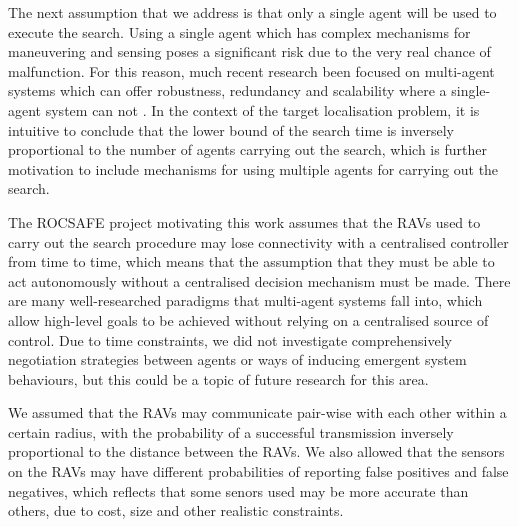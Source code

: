 The next assumption that we address is that only a single agent will be used to execute the search. Using a single agent which has complex mechanisms for maneuvering and sensing poses a significant risk due to the very real chance of malfunction. For this reason, much recent research been focused on multi-agent systems which can offer robustness, redundancy and scalability where a single-agent system can not \cite{Stone2000MultiagentPerspective}. In the context of the target localisation problem, it is intuitive to conclude that the lower bound of the search time is inversely proportional to the number of agents carrying out the search, which is further motivation to include mechanisms for using multiple agents for carrying out the search.

The ROCSAFE project \cite{Bagherzadeh2017ROCSAFE:Incidents} motivating this work assumes that the RAVs used to carry out the search procedure may lose connectivity with a centralised controller from time to time, which means that the assumption that they must be able to act autonomously without a centralised decision mechanism must be made. There are many well-researched paradigms that multi-agent systems fall into, which allow high-level goals to be achieved without relying on a centralised source of control. Due to time constraints, we did not investigate comprehensively negotiation strategies between agents or ways of inducing emergent system behaviours, but this could be a topic of future research for this area.\par

We assumed that the RAVs may communicate pair-wise with each other within a certain radius, with the probability of a successful transmission inversely proportional to the distance between the RAVs. We also allowed that the sensors on the RAVs may have different probabilities of reporting false positives and false negatives, which reflects that some senors used may be more accurate than others, due to cost, size and other realistic constraints. \par

